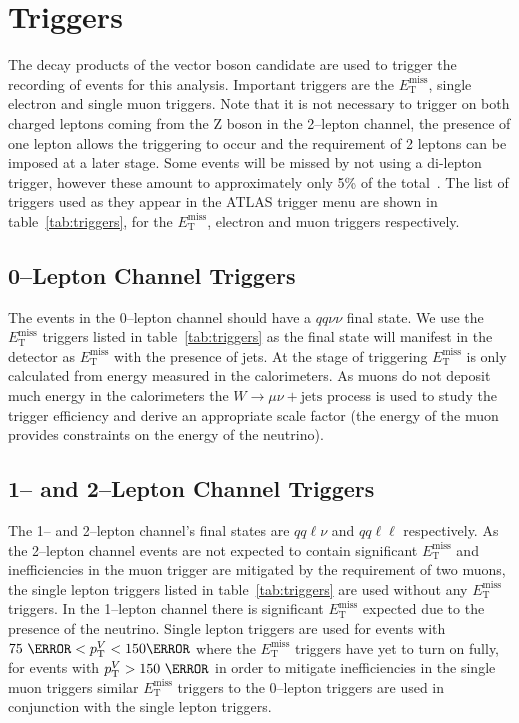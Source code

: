 \section{Triggers}
\label{sec:triggers}

The decay products of the vector boson candidate are used to trigger the
recording of events for this analysis. Important triggers are the
$E_{\mathrm{T}}^{\text{miss}}$, single electron and single muon triggers. Note
that it is not necessary to trigger on both charged leptons coming from the Z
boson in the 2--lepton channel, the presence of one lepton allows the triggering
to occur and the requirement of 2 leptons can be imposed at a later stage. Some
events will be missed by not using a di-lepton trigger, however these amount to
approximately only 5\% of the total~\cite{VHObjectNote2019}. The list of
triggers used as they appear in the ATLAS trigger menu are shown in
table~\ref{tab:triggers}, for the $E_{\mathrm{T}}^{\text{miss}}$, electron and
muon triggers respectively.


\subsection{0--Lepton Channel Triggers}
The events in the 0--lepton channel should have a $qq\nu\nu$ final state. We use
the $E_{\mathrm{T}}^{\text{miss}}$ triggers listed in table~\ref{tab:triggers} as the final
state will manifest in the detector as $E_{\mathrm{T}}^{\text{miss}}$ with the presence of
jets. At the stage of triggering $E_{\mathrm{T}}^{\text{miss}}$ is only calculated from
energy measured in the calorimeters. As muons do not deposit much energy in the
calorimeters the $W \to \mu \nu + \text{jets}$ process is used to study the
trigger efficiency and derive an appropriate scale factor (the energy of the
muon provides constraints on the energy of the neutrino).

\subsection{1-- and 2--Lepton Channel Triggers}
The 1-- and 2--lepton channel's final states are $qq\ell\nu$ and $qq\ell\ell$
respectively. As the 2--lepton channel events are not expected to contain
significant $E_{\mathrm{T}}^{\text{miss}}$ and inefficiencies in the muon trigger are
mitigated by the requirement of two muons, the single lepton triggers listed in
table~\ref{tab:triggers} are used without any $E_{\mathrm{T}}^{\text{miss}}$
triggers. In the 1--lepton channel there is significant $E_{\mathrm{T}}^{\text{miss}}$
expected due to the presence of the neutrino. Single lepton triggers are used
for events with $75~\GeV < p_{\mathrm{T}}^{V} < 150 \GeV$ where the $E_{\mathrm{T}}^{\text{miss}}$
triggers have yet to turn on fully, for events with $p_{\mathrm{T}}^{V} > 150~\GeV$ in
order to mitigate inefficiencies in the single muon triggers similar
$E_{\mathrm{T}}^{\text{miss}}$ triggers to the 0--lepton triggers are used in conjunction
with the single lepton triggers.

